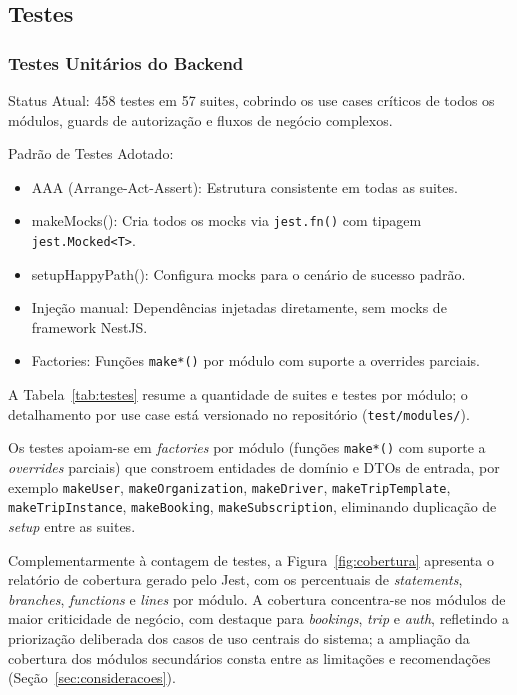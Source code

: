 \subsection{Testes}
\label{subsec:verificacao}

\subsubsection{Testes Unitários do Backend}

Status Atual: 458 testes em 57 suites, cobrindo os use cases críticos de todos os módulos, guards de autorização e fluxos de negócio complexos.

Padrão de Testes Adotado:
\begin{itemize}
\item AAA (Arrange-Act-Assert): Estrutura consistente em todas as suites.
\item makeMocks(): Cria todos os mocks via \texttt{jest.fn()} com tipagem \texttt{jest.Mocked<T>}.
\item setupHappyPath(): Configura mocks para o cenário de sucesso padrão.
\item Injeção manual: Dependências injetadas diretamente, sem mocks de framework NestJS.
\item Factories: Funções \texttt{make*()} por módulo com suporte a overrides parciais.
\end{itemize}

A Tabela~\ref{tab:testes} resume a quantidade de suites e testes por módulo; o detalhamento por use case está versionado no repositório (\texttt{test/modules/}).



Os testes apoiam-se em \textit{factories} por módulo (funções \texttt{make*()} com suporte a \textit{overrides} parciais) que constroem entidades de domínio e DTOs de entrada, por exemplo \texttt{makeUser}, \texttt{makeOrganization}, \texttt{makeDriver}, \texttt{makeTripTemplate}, \texttt{makeTripInstance}, \texttt{makeBooking}, \texttt{makeSubscription}, eliminando duplicação de \textit{setup} entre as suites.

Complementarmente à contagem de testes, a Figura~\ref{fig:cobertura} apresenta o relatório de cobertura gerado pelo Jest, com os percentuais de \textit{statements}, \textit{branches}, \textit{functions} e \textit{lines} por módulo. A cobertura concentra-se nos módulos de maior criticidade de negócio, com destaque para \textit{bookings}, \textit{trip} e \textit{auth}, refletindo a priorização deliberada dos casos de uso centrais do sistema; a ampliação da cobertura dos módulos secundários consta entre as limitações e recomendações (Seção~\ref{sec:consideracoes}).

